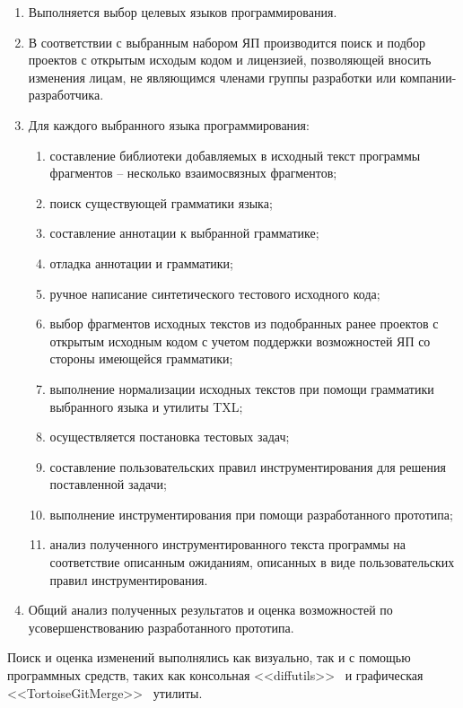 \begin{enumerate}[label=\arabic*]
  \item Выполняется выбор целевых языков программирования.
  \item В соответствии с выбранным набором ЯП производится поиск и подбор проектов с открытым исходым кодом и лицензией, позволяющей вносить изменения лицам, не являющимся членами группы разработки или компании-разработчика.
  \item Для каждого выбранного языка программирования:
    \begin{enumerate}[label*=.\arabic*]
      \item составление библиотеки добавляемых в исходный текст программы фрагментов -- несколько взаимосвязных фрагментов;

      \item поиск существующей грамматики языка;
      \item составление аннотации к выбранной грамматике;
      \item отладка аннотации и грамматики;

      \item ручное написание синтетического тестового исходного кода;
      \item выбор фрагментов исходных текстов из подобранных ранее проектов с открытым исходным кодом с учетом поддержки возможностей ЯП со стороны имеющейся грамматики;
      \item выполнение нормализации исходных текстов при помощи грамматики выбранного языка и утилиты TXL;

      \item осуществляется постановка тестовых задач;
      \item составление пользовательских правил инструментирования для решения поставленной задачи;

      \item выполнение инструментирования при помощи разработанного прототипа;
      \item анализ полученного инструментированного текста программы на соответствие описанным ожиданиям, описанных в виде пользовательских правил инструментирования.
    \end{enumerate}

  \item Общий анализ полученных результатов и оценка возможностей по усовершенствованию разработанного прототипа.
\end{enumerate}

Поиск и оценка изменений выполнялись как визуально, так и с помощью программных средств, таких как консольная <<diffutils>>~\cite{git} и графическая <<TortoiseGitMerge>>~\cite{tortoise-git} утилиты.

